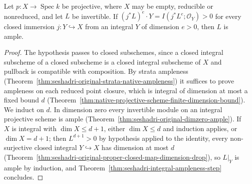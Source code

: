 \begin{theorem}
\label{thm:nakai-general-projective}
\leanok
{}
Let $p:X\to\operatorname{Spec}k$ be projective, where $X$ may be empty, reducible or
nonreduced, and let $L$ be invertible. If $(j^*L)^e\cdot Y=I(j^*L^e;\mathcal O_Y)>0$ for every
closed immersion $j:Y\hookrightarrow X$ from an integral $Y$ of dimension $e>0$, then $L$ is
ample.
\end{theorem}
\begin{proof}
The hypothesis passes to closed subschemes, since a closed integral subscheme of a closed
subscheme is a closed integral subscheme of $X$ and pullback is compatible with
composition. By strata ampleness
(Theorem~\ref{thm:seshadri-original-strata-native-ampleness}) it suffices to prove ampleness
on each reduced point closure, which is integral of dimension at most a fixed bound $d$
(Theorem~\ref{thm:native-projective-scheme-finite-dimension-bound}). We induct on $d$. In
dimension zero every invertible module on an integral projective scheme is ample
(Theorem~\ref{thm:seshadri-original-dimzero-ample}). If $X$ is integral with
$\dim X\le d+1$, either $\dim X\le d$ and induction applies, or $\dim X=d+1$; then
$L^{d+1}>0$ by hypothesis applied to the identity, every non-surjective closed integral
$Y\hookrightarrow X$ has dimension at most $d$
(Theorem~\ref{thm:seshadri-original-proper-closed-map-dimension-drop}), so $L|_Y$ is ample
by induction, and Theorem~\ref{thm:seshadri-integral-ampleness-step} concludes.
\end{proof}
